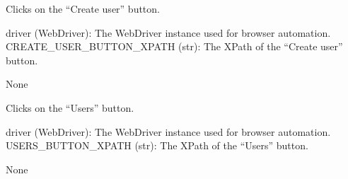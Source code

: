 \documentclass[letterpaper,10pt,english]{sphinxmanual}
\begin{document}
\begin{fulllineitems}
\label{\detokenize{utils:utils.user_management.click_on_create_user}}
\pysigstartsignatures
{}
\pysigstopsignatures
\sphinxAtStartPar
Clicks on the “Create user” button.
\begin{description}
\sphinxAtStartPar
driver (WebDriver): The WebDriver instance used for browser automation.
CREATE\_USER\_BUTTON\_XPATH (str): The XPath of the “Create user” button.

\sphinxAtStartPar
None

\end{description}

\end{fulllineitems}


\begin{fulllineitems}
\label{\detokenize{utils:utils.user_management.click_users_button}}
\pysigstartsignatures
{}
\pysigstopsignatures
\sphinxAtStartPar
Clicks on the “Users” button.
\begin{description}
\sphinxAtStartPar
driver (WebDriver): The WebDriver instance used for browser automation.
USERS\_BUTTON\_XPATH (str): The XPath of the “Users” button.

\sphinxAtStartPar
None

\end{description}

\end{fulllineitems}

\end{document}
